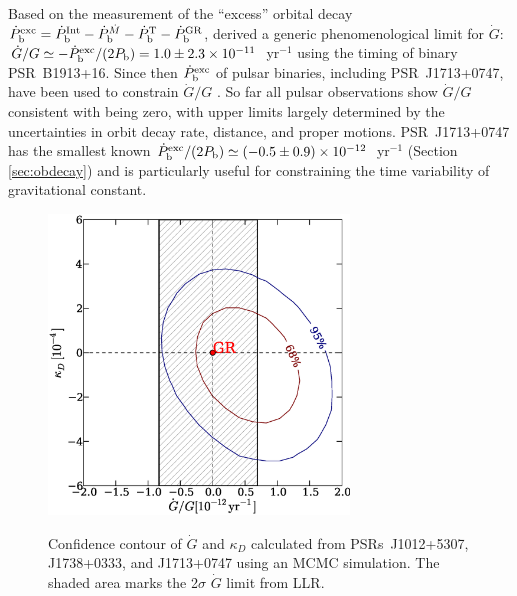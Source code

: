 Based on the measurement of the ``excess'' orbital decay 
$\dot{P}_{\rm b}^{\rm exc}=\dot{P}_{\rm b}^{\rm Int} - \dot{P}_{\rm
b}^{\dot{M}}  - \dot{P}_{\rm b}^{\rm T} - \dot{P}_{\rm b}^{\rm GR}$,
\citet{dgt88} derived a generic phenomenological limit for $\dot{G}$: 
$\dot{G}/G\simeq-\dot{P}_{\rm b}^{\rm exc}/(2P_{\rm
b})=1.0\pm2.3\times10^{-11}$~yr$^{-1}$ using the timing of binary PSR~B1913+16. 
Since then $\dot{P}_{\rm b}^{\rm exc}$ of pulsar binaries, including 
PSR~J1713+0747, have been used to 
constrain $\dot{G}/G$ \citep{ktr94, nss+05, dvtb08, lwj+09, fwe+12}. 
So far all pulsar observations show $\dot{G}/G$ consistent with being zero, with 
upper limits largely determined by the uncertainties in orbit decay rate, distance, 
and proper motions.
PSR~J1713+0747 has the smallest known $\dot{P}_{\rm b}^{\rm exc}/(2P_{\rm
b})\simeq(-0.5\pm0.9)\times10^{-12}$~yr$^{-1}$ (Section \ref{sec:obdecay}) and is
particularly useful for constraining the time variability of gravitational
constant.

\begin{figure}
\includegraphics[width=8cm]{finalGdot.ps} \\ 
\caption {\label{fig:Gdot} Confidence contour of $\dot{G}$ and $\kappa_D$
calculated from PSRs~J1012+5307, J1738+0333, and J1713+0747 using an MCMC simulation.
The shaded area marks the 2$\sigma$ $\dot{G}$ limit from LLR. 
} 
\end{figure} 

